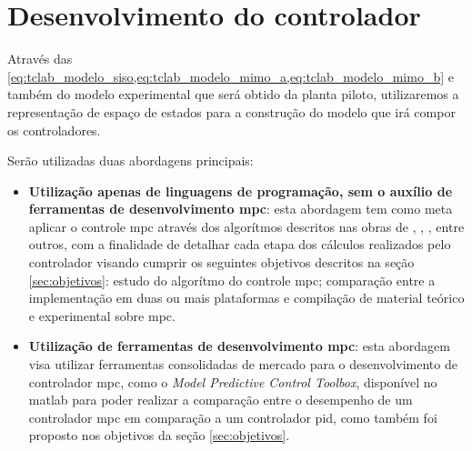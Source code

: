 \section{Desenvolvimento do controlador}
\label{sec:desenvolvimento_do_controlador}

Através das \cref{eq:tclab_modelo_siso,eq:tclab_modelo_mimo_a,eq:tclab_modelo_mimo_b}
e também do modelo experimental que será obtido da planta piloto, utilizaremos a representação de
espaço de estados para a construção do modelo que irá compor os controladores.

Serão utilizadas duas abordagens principais:

\begin{itemize}
    \item \textbf{Utilização apenas de linguagens de programação, sem o auxílio de ferramentas de desenvolvimento
        \acrshort{mpc}}: esta abordagem tem como meta aplicar o controle \acrshort{mpc} através dos algorítmos
        descritos nas obras de , , ,
        entre outros, com a finalidade de detalhar cada etapa dos cálculos realizados pelo controlador
        visando cumprir os seguintes objetivos descritos na seção \ref{sec:objetivos}: estudo do algorítmo do
        controle \acrshort{mpc}; comparação entre a implementação em duas ou mais plataformas e compilação
        de material teórico e experimental sobre \acrshort{mpc}.
    \item \textbf{Utilização de ferramentas de desenvolvimento \acrshort{mpc}}: esta abordagem visa utilizar
        ferramentas consolidadas de mercado para o desenvolvimento de controlador \acrshort{mpc}, como o
        \textit{Model Predictive Control Toolbox}, disponível no \acrshort{matlab} para poder realizar
        a comparação entre o desempenho de um controlador \acrshort{mpc} em comparação a um controlador
        \acrshort{pid}, como também foi proposto nos objetivos da seção \ref{sec:objetivos}.
\end{itemize}